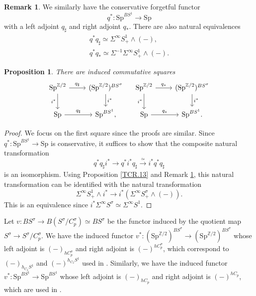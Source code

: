 \documentclass[10pt]{amsart}
\newtheorem{prop}[thm]{Proposition}
\theoremstyle{definition}
\newtheorem{rmk}[thm]{Remark}
\theoremstyle{remark}
\numberwithin{equation}{section}
\newcommand{\Z}{\mathbb{Z}}
\newcommand{\Sp}{\mathrm{Sp}}
\begin{document}
\begin{rmk}
\label{TCR.14}
We similarly have the conservative forgetful functor
\[
q^*\colon \Sp^{BS^1}\to \Sp
\]
with a left adjoint $q_\sharp$ and right adjoint $q_*$.
There are also natural equivalences
\begin{gather*}
q^*q_\sharp\simeq \Sigma^\infty S_+^1 \wedge (-),
\\
q^*q_*\simeq \Sigma^{-1} \Sigma^\infty S_+^1 \wedge (-).
\end{gather*}
\end{rmk}

\begin{prop}
\label{TCR.15}
There are induced commutative squares
\[
\begin{tikzcd}
\Sp^{\Z/2}\ar[d,"i^*"']\ar[r,"q_\sharp"]&
(\Sp^{\Z/2})^{BS^\sigma}\ar[d,"i^*"]
\\
\Sp\ar[r,"q_\sharp"]&
\Sp^{BS^1},
\end{tikzcd}
\quad
\begin{tikzcd}
\Sp^{\Z/2}\ar[d,"i^*"']\ar[r,"q_*"]&
(\Sp^{\Z/2})^{BS^\sigma}\ar[d,"i^*"]
\\
\Sp\ar[r,"q_*"]&
\Sp^{BS^1}.
\end{tikzcd}
\]
\end{prop}
\begin{proof}
We focus on the first square since the proofs are similar.
Since $q^*\colon \Sp^{BS^1}\to \Sp$ is conservative,
it suffices to show that the composite natural transformation
\[
q^*q_\sharp i^*
\to
q^*i^*q_\sharp
\xrightarrow{\simeq}
i^*q^*q_\sharp
\]
is an isomorphism.
Using Proposition \ref{TCR.13} and Remark \ref{TCR.14},
this natural transformation can be identified with the natural transformation
\[
\Sigma^\infty S_+^1\wedge i^*
\to
i^*(\Sigma^\infty S_+^\sigma \wedge (-)).
\]
This is an equivalence since $i^*\Sigma^\infty S^\sigma\simeq \Sigma^\infty S^1$.
\end{proof}



Let $v\colon BS^\sigma \to B(S^\sigma/C_p^\sigma)\simeq BS^\sigma$ be the functor induced by the quotient map $S^\sigma \to S^\sigma/C_p^\sigma$.
We have the induced functor $v^*\colon (\Sp^{\Z/2})^{BS^\sigma}\to (\Sp^{\Z/2})^{BS^\sigma}$ whose left adjoint is $(-)_{hC_p^\sigma}$ and right adjoint is $(-)^{hC_p^\sigma}$,
which correspond to $(-)_{h_{C_2}S^1}$ and $(-)^{h_{C_2}S^1}$ used in \cite[Example 5.57]{QS1}.
Similarly,
we have the induced functor $v^*\colon \Sp^{BS^1}\to \Sp^{BS^1}$ whose left adjoint is $(-)_{hC_p}$ and right adjoint is $(-)^{hC_p}$,
which are used in \cite[Theorem 1.3]{NS}.
\end{document}
